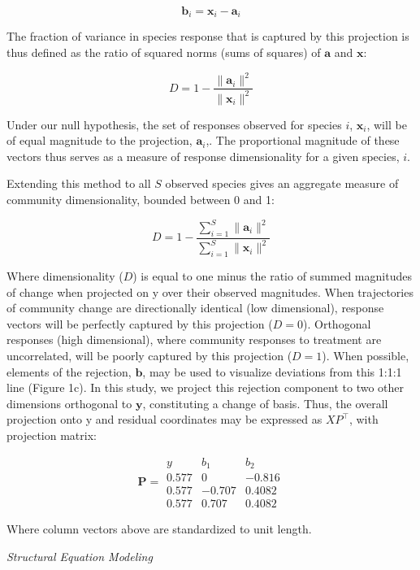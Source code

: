 \documentclass[twoside,12pt,final]{ucthesis-CA2012}
\begin{document}
\begin{ucmainmatter}
\[\mathbf{b}_i = \mathbf{x}_i - \mathbf{a}_i\]

The fraction of variance in species response that is captured by this projection is thus defined as the ratio of squared norms (sums of squares) of \(\mathbf{a}\) and \(\mathbf{x}\):

\[D = 1 - \frac{\|\mathbf{a}_i\|^2}{\|\mathbf{x}_i\|^2}\]

Under our null hypothesis, the set of responses observed for species \(i\), \(\mathbf{x}_i\), will be of equal magnitude to the projection, \(\mathbf{a}_i\),. The proportional magnitude of these vectors thus serves as a measure of response dimensionality for a given species, \(i\).

Extending this method to all \(S\) observed species gives an aggregate measure of community dimensionality, bounded between 0 and 1:

\[D = 1 - \frac{\sum_{i = 1}^{S}\|\mathbf{a}_i\|^2}{\sum_{i = 1}^{S}\|\mathbf{x}_i\|^2}\]

Where dimensionality (\(D\)) is equal to one minus the ratio of summed magnitudes of change when projected on y over their observed magnitudes. When trajectories of community change are directionally identical (low dimensional), response vectors will be perfectly captured by this projection (\(D = 0\)). Orthogonal responses (high dimensional), where community responses to treatment are uncorrelated, will be poorly captured by this projection (\(D = 1\)).
When possible, elements of the rejection, \(\mathbf{b}\), may be used to visualize deviations from this 1:1:1 line (Figure 1c). In this study, we project this rejection component to two other dimensions orthogonal to \(\mathbf{y}\), constituting a change of basis. Thus, the overall projection onto y and residual coordinates may be expressed as \(XP^\top\), with projection matrix:

\[
\mathbf{P} = 
\begin{matrix}
y & b_1 & b_2 \\
\hline
0.577 & 0 & -0.816 \\
0.577 & -0.707 & 0.4082 \\
0.577 & 0.707 & 0.4082 
\end{matrix}
\]

Where column vectors above are standardized to unit length.

\emph{Structural Equation Modeling}


\end{ucmainmatter}
\end{document}
